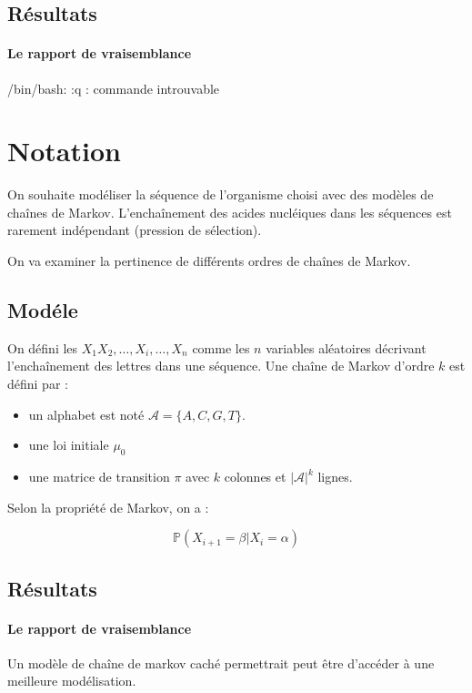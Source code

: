 \documentclass[12pt,a4paper]{article}
\begin{document}
\subsection{Résultats}

\paragraph{Le rapport de vraisemblance}


/bin/bash: :q : commande introuvable
\section{Notation }

On souhaite modéliser la séquence de l'organisme choisi avec des modèles de chaînes de Markov. 
L'enchaînement des acides nucléiques dans les séquences est rarement indépendant (pression de sélection).

On va examiner la pertinence de différents ordres de chaînes de Markov. 


\subsection{Modéle}

On défini les $X_1X_2, \dots, X_i, \dots, X_n$ comme les $n$ variables aléatoires décrivant l'enchaînement des lettres dans une séquence.
Une chaîne de Markov d'ordre $k$ est défini par : 

\begin{itemize}
\item un alphabet est noté $\mathcal{A} = \{A,C,G,T\}$.
\item une loi initiale $\mu_0$
\item une matrice de transition $\pi$ avec $k$ colonnes et $|\mathcal{A}|^k$ lignes.
\end{itemize}

Selon la propriété de Markov, on a  : 

\[
\mathbb{P}(X_{i+1} = \beta | X_i = \alpha ) 
\]


\subsection{Résultats}

\paragraph{Le rapport de vraisemblance}



Un modèle de chaîne de markov caché permettrait peut être d'accéder à une meilleure modélisation.
\end{document}
